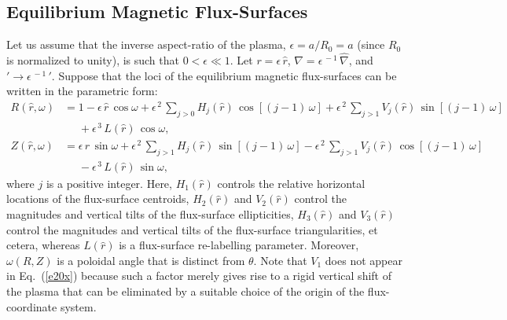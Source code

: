 \documentclass[12pt,prb,aps]{revtex4-1}
\begin{document}
\subsection{Equilibrium Magnetic Flux-Surfaces}\label{flux}
Let us assume that the inverse aspect-ratio of the plasma, $\epsilon=a/R_0=a$ (since $R_0$ is normalized to unity), is such that $0<\epsilon\ll 1$.  
Let $r=\epsilon\,\hat{r}$, $\nabla =\epsilon^{\,-1}\,\hat{\nabla}$, and $'\rightarrow \epsilon^{\,-1}\,'$. 
Suppose that the loci of the equilibrium magnetic flux-surfaces can be written in the parametric form:\,\cite{tj,tj1,connor}
\begin{align}
R(\hat{r},\omega) &= 1 -\epsilon\,\hat{r}\,\cos\omega + \epsilon^{\,2}\,\sum_{j>0}H_j(\hat{r})\,\cos[(j-1)\,\omega] + \epsilon^{\,2}\,\sum_{j>1}V_j(\hat{r})\,\sin[(j-1)\,\omega] \nonumber\\[0.5ex]
&\phantom{=}+\epsilon^{\,3}\,L(\hat{r})\,\cos\omega,\label{e19x}\\[0.5ex]
Z(\hat{r},\omega)&= \epsilon\,\hat{r}\,\sin\omega +\epsilon^{\,2}\,\sum_{j>1}H_j(\hat{r})\,\sin[(j-1)\,\omega]
-\epsilon^{\,2}\,\sum_{j>1}V_j(\hat{r})\,\cos[(j-1)\,\omega]\nonumber\\[0.5ex]&\phantom{=}-\epsilon^{\,3}\,L(\hat{r})\,\sin\omega,\label{e20x}
\end{align}
where $j$ is a positive integer. 
Here, $H_1(\hat{r})$  controls the relative horizontal locations of the flux-surface centroids, $H_2(\hat{r})$ and $V_2(\hat{r})$ control the 
magnitudes and vertical tilts of the flux-surface ellipticities, $H_3(\hat{r})$ and
$V_3(\hat{r})$ control the magnitudes and vertical tilts of the flux-surface triangularities, et cetera, whereas $L(\hat{r})$ is a
flux-surface re-labelling parameter. Moreover, $\omega(R,Z)$ is a  poloidal angle that is distinct from $\theta$. Note that $V_1$ does not appear in Eq.~(\ref{e20x})
because such a factor merely gives rise to a rigid vertical shift of the plasma that can be eliminated by a suitable choice of the
origin of the flux-coordinate system.
\end{document}
